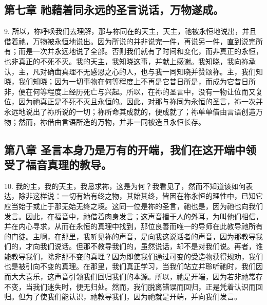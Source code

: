 
\subsection{第七章 祂藉着同永远的圣言说话，万物遂成。}

9. 所以，祢呼唤我们去理解，那与祢同在的天主，天主，祂被永恒地说出，并且借着祂，万物被永恒地说出。因为所说的并非说完一件，再说另一件，直到说完所有；而是一次并永远地说了全部。否则我们就有了时间和变化，而非真正的永恒，也非真正的不死不灭。我的天主，我知晓这事，并献上感谢。我知晓，我向祢承认，主，凡对确凿真理不无感恩之心的人，也与我一同知晓并赞颂祢。主，我们知晓，我们知晓；因为一切事物在何等程度上不再是它昔日所是，而成为它昔日所非，便在何等程度上经历死亡与兴起。所以，在祢的圣言中，没有一物让位而又复位，因为祂真正是不死不灭且永恒的。因此，对那与祢同为永恒的圣言，祢一次并永远地说出了祢所说的一切；祢所命其成就的，便成就了；祢单单借由言语创造万物；然而，祢借由言语所造的万物，并非一同被造且永恒长存。\par


\subsection{第八章 圣言本身乃是万有的开端，我们在这开端中领受了福音真理的教导。}

10. 我的主，我的天主，我恳求祢，这是为何？我看见了，然而不知道该如何表达，除非这样说：一切有始有终之物，其始其终，皆因在祢永恒的理性中，已知它应当始于或止于那无始无终之境。这同一位是祢的圣言，祂也是，因为祂也向我们发言。因此，在福音中，祂借着肉身发言；这声音播于人的外耳，为叫他们相信，并在内心寻求，从而在永恒的真理中找到，那位良善而唯一的导师在此教导祂所有的门徒。主啊，在那里，我听见祢的声音，是向我这说话者的声音，因为那教导我们的，才向我们说话。但那不教导我们的，虽然说话，却不是对我们说。再者，谁能教导我们，除非那不变的真理？因为即使我们通过可变的受造物获得规劝，我们也是被引向不变的真理。在那里，我们真正学习，当我们站立并聆听祂时，我们因而大大喜乐，这声音引领我们回归我们的本源。所以，祂是开端，因为若非祂常存不变，当我们迷失时，便无归处。然而，我们脱离错误而回归，正是凭着认识而回归。但为了使我们能认识，祂教导我们，因为祂就是开端，并向我们发言。\par

